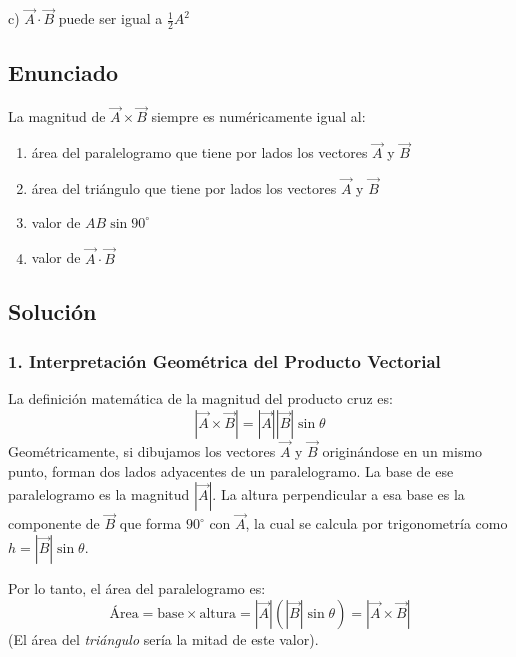 \documentclass[12pt, a4paper]{article}
\begin{document}
\begin{tcolorbox}[colback=green!5!white, colframe=green!50!black, title=Respuesta Final]
\centering \Large c) $\vec{A} \cdot \vec{B}$ puede ser igual a $\frac{1}{2} A^2$
\end{tcolorbox}

\newpage


\subsection*{Enunciado}
La magnitud de $\vec{A} \times \vec{B}$ siempre es numéricamente igual al:
\begin{enumerate}[label=\alph*)]
    \item área del paralelogramo que tiene por lados los vectores $\vec{A}$ y $\vec{B}$
    \item área del triángulo que tiene por lados los vectores $\vec{A}$ y $\vec{B}$
    \item valor de $AB\sin 90^\circ$
    \item valor de $\vec{A} \cdot \vec{B}$
\end{enumerate}

\subsection*{Solución}

\subsubsection*{1. Interpretación Geométrica del Producto Vectorial}
La definición matemática de la magnitud del producto cruz es:
$$ |\vec{A} \times \vec{B}| = |\vec{A}| |\vec{B}| \sin\theta $$
Geométricamente, si dibujamos los vectores $\vec{A}$ y $\vec{B}$ originándose en un mismo punto, forman dos lados adyacentes de un paralelogramo. 
La base de ese paralelogramo es la magnitud $|\vec{A}|$. 
La altura perpendicular a esa base es la componente de $\vec{B}$ que forma $90^\circ$ con $\vec{A}$, la cual se calcula por trigonometría como $h = |\vec{B}|\sin\theta$.

Por lo tanto, el área del paralelogramo es:
$$ \text{Área} = \text{base} \times \text{altura} = |\vec{A}| (|\vec{B}|\sin\theta) = |\vec{A} \times \vec{B}| $$
(El área del \textit{triángulo} sería la mitad de este valor).
\end{document}
